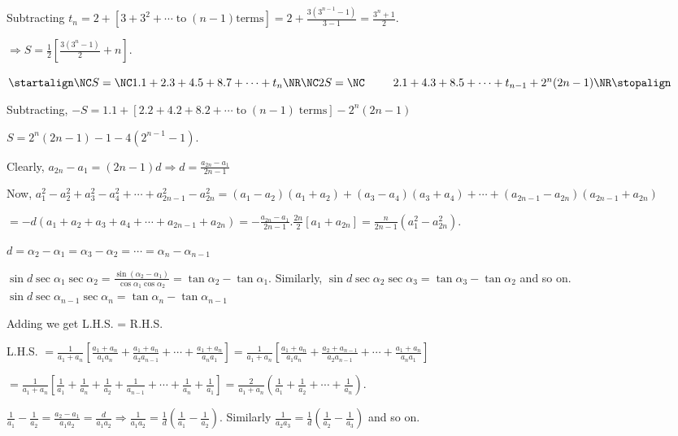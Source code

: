   Subtracting $t_n = 2 + [3 + 3^2 + \cdots\;\mathrm{to}\;(n - 1)\mathrm{terms}] = 2 + \frac{3(3^{n - 1} -
    1)}{3 - 1} = \frac{3^n + 1}{2}$.

  $\Rightarrow S = \frac{1}{2}\left[\frac{3(3^n - 1)}{2} + n\right]$.
\item $\startalign\NC S = \NC1.1 + 2.3 + 4.5 + 8.7 + \cdots + t_n\NR\NC 2S = \NC\;\;\;\;\;\;\;\;\; 2.1 + 4.3 +
  8.5 + \cdots + t_{n - 1} + 2^n(2n - 1)\NR\stopalign$

  Subtracting, $-S = 1.1 + [2.2 + 4.2 + 8.2 + \cdots\;\mathrm{to}\;(n - 1)\;\mathrm{terms}] - 2^n(2n - 1)$

  $S = 2^n(2n - 1) - 1 - 4(2^{n - 1} - 1)$.
\item Clearly, $a_{2n} - a_1 = (2n - 1)d \Rightarrow d = \frac{a_{2n} - a_1}{2n - 1}$

  Now, $a_1^2 - a_2^2 + a_3^2 - a_4^2 + \cdots + a_{2n - 1}^2 - a_{2n}^2 = (a_1 - a_2)(a_1 + a_2) + (a_3 -
  a_4)(a_3 + a_4) + \cdots + (a_{2n - 1} - a_{2n})(a_{2n - 1} + a_{2n})$

  $= -d(a_1 + a_2 + a_3 + a_4 + \cdots + a_{2n - 1} + a_{2n}) = -\frac{a_{2n} - a_1}{2n -
    1}.\frac{2n}{2}\left[a_1 + a_{2n}\right] = \frac{n}{2n - 1}(a_1^2 - a_{2n}^2)$.
\item $d = \alpha_2 - \alpha_1 = \alpha_3 - \alpha_2 = \cdots = \alpha_n - \alpha_{n - 1}$

  $\sin d\sec\alpha_1\sec\alpha_2 = \frac{\sin(\alpha_2 - \alpha_1)}{\cos\alpha_1\cos\alpha_2} =\tan\alpha_2 -
  \tan\alpha_1$. Similarly, $\sin d\sec\alpha_2\sec\alpha_3 = \tan\alpha_3 - \tan\alpha_2$ and so
  on. $\sin d\sec\alpha_{n - 1}\sec\alpha_n = \tan\alpha_n - \tan\alpha_{n - 1}$

  Adding we get L.H.S. = R.H.S.
\item L.H.S. $= \frac{1}{a_1 + a_n}\left[\frac{a_1 + a_n}{a_1a_n} + \frac{a_1 + a_n}{a_2a_{n - 1}} + \cdots
  + \frac{a_1 + a_n}{a_na_1}\right] = \frac{1}{a_1 + a_n}\left[\frac{a_1 + a_n}{a_1a_n} + \frac{a_2 +
    a_{n - 1}}{a_2a_{n - 1}} + \cdots + \frac{a_1 + a_n}{a_na_1}\right]$

  $= \frac{1}{a_1 + a_n}\left[\frac{1}{a_1} + \frac{1}{a_n} + \frac{1}{a_2} + \frac{1}{a_{n - 1}} + \cdots +
  \frac{1}{a_n} + \frac{1}{a_1}\right] = \frac{2}{a_1 + a_n}\left(\frac{1}{a_1} + \frac{1}{a_2} + \cdots +
  \frac{1}{a_n}\right)$.
\item $\frac{1}{a_1} - \frac{1}{a_2} = \frac{a_2 - a_1}{a_1a_2} = \frac{d}{a_1a_2} \Rightarrow
  \frac{1}{a_1a_2} = \frac{1}{d}\left(\frac{1}{a_1} - \frac{1}{a_2}\right)$. Similarly $\frac{1}{a_2a_3}=
  \frac{1}{d}\left(\frac{1}{a_2} - \frac{1}{a_3}\right)$ and so on.


